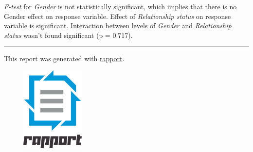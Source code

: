 \documentclass[]{article}
\makeatletter
\def\maxwidth{\ifdim\Gin@nat@width>\linewidth\linewidth
\else\Gin@nat@width\fi}
\let\Oldincludegraphics\includegraphics
\renewcommand{\includegraphics}[1]{\Oldincludegraphics[width=\maxwidth]{#1}}
\makeatother
\begin{document}
\emph{F-test} for \emph{Gender} is not statistically significant, which
implies that there is no Gender effect on response variable. Effect of
\emph{Relationship status} on response variable is significant.
Interaction between levels of \emph{Gender} and \emph{Relationship
status} wasn't found significant (p = 0.717).

\begin{center}\rule{3in}{0.4pt}\end{center}

This report was generated with
\href{http://rapport-package.info/}{rapport}.

\begin{figure}[htbp]
\centering
\includegraphics{images/rapport.png}
\caption{}
\end{figure}
\end{document}
